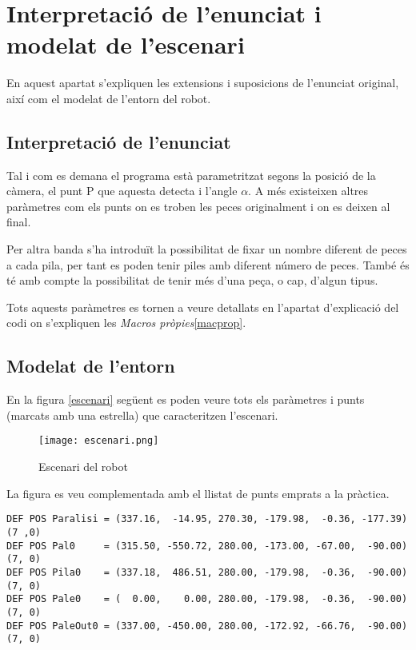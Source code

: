 \section{Interpretació de l'enunciat i modelat de l'escenari}
En aquest apartat s'expliquen les extensions i suposicions de l'enunciat original,
així com el modelat de l'entorn del robot.

\subsection{Interpretació de l'enunciat}
Tal i com es demana el programa està parametritzat segons la posició de la càmera,
el punt P que aquesta detecta i l'angle $\alpha$. A més existeixen altres paràmetres
com els punts on es troben les peces originalment i on es deixen al final.

Per altra banda s'ha introduït la possibilitat de fixar un nombre diferent de peces
a cada pila, per tant es poden tenir piles amb diferent número de peces. També
és té amb compte la possibilitat de tenir més d'una peça, o cap, d'algun tipus.

Tots aquests paràmetres es tornen a veure detallats en l'apartat d'explicació del
codi on s'expliquen les \emph{Macros pròpies}\ref{macprop}.

\subsection{Modelat de l'entorn}

En la figura \ref{escenari} següent es poden veure tots els paràmetres i punts
(marcats amb una estrella) que caracteritzen l'escenari.

\begin{figure}[H]
\begin{center}\label{fig:escenari}
 \texttt{[image: escenari.png]}
\end{center}
  \caption{Escenari del robot}
\end{figure}

La figura es veu complementada amb el llistat de punts emprats a la pràctica.

\begin{verbatim}
DEF POS Paralisi = (337.16,  -14.95, 270.30, -179.98,  -0.36, -177.39)(7 ,0)
DEF POS Pal0     = (315.50, -550.72, 280.00, -173.00, -67.00,  -90.00)(7, 0)
DEF POS Pila0    = (337.18,  486.51, 280.00, -179.98,  -0.36,  -90.00)(7, 0)
DEF POS Pale0    = (  0.00,    0.00, 280.00, -179.98,  -0.36,  -90.00)(7, 0)
DEF POS PaleOut0 = (337.00, -450.00, 280.00, -172.92, -66.76,  -90.00)(7, 0)
\end{verbatim}

